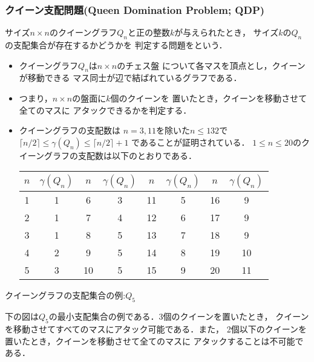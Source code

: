 \documentclass[dvipdfmx,10pt]{beamer}
\begin{document}
\begin{frame}\frametitle{クイーン支配問題(Queen Domination Problem; QDP)}
 \begin{block}{}
  サイズ$n\times n$のクイーングラフ$Q_n$と正の整数$k$が与えられたとき，
  サイズ$k$の$Q_n$の支配集合が存在するかどうかを
  判定する問題をという．
  \begin{itemize}
   \item クイーングラフ$Q_n$は$n\times n$のチェス盤
	 について各マスを頂点とし，クイーンが移動できる
	 マス同士が辺で結ばれているグラフである．
   \item つまり，$n \times n$の盤面に$k$個のクイーンを
	 置いたとき，クイーンを移動させて全てのマスに
	 アタックできるかを判定する．
  \end{itemize}
 \end{block}
 \begin{block}{}
  \begin{itemize}
   \item クイーングラフの支配数は
$n=3,11$を除いた$n \leq 132$で $\lceil n/2 \rceil 
\leq \gamma(Q_{n}) \leq \lceil n/2 \rceil +1$
であることが証明されている．%
$1\leq n \leq 20$のクイーングラフの支配数は以下のとおりである．
  \begin{table}[hbtp]
   \centering
   \begin{tabular}{|c|c||c|c||c|c||c|c|} \hline
    $n$ & $\gamma(Q_{n})$ & $n$ & $\gamma(Q_{n})$ &$n$ & $\gamma(Q_{n})$ &$n$ & $\gamma(Q_{n})$ \\ \hline
    1 &1 &6 &3 &11 &5 &16 &9 \\ \hline
    2 &1 &7 &4 &12 &6 &17 &9 \\ \hline
    3 &1 &8 &5 &13 &7 &18 &9 \\ \hline
    4 &2 &9 &5 &14 &8 &19 &10 \\ \hline
    5 &3 &10 &5 &15 &9 &20 &11 \\ \hline
   \end{tabular}
  \end{table}
  \end{itemize}
 \end{block}
\end{frame}
 

%
%

\begin{frame}{クイーングラフの支配集合の例:$Q_5$}
  \begin{exampleblock}{}
   下の図は$Q_5$の最小支配集合の例である．3個のクイーンを置いたとき，
   クイーンを移動させてすべてのマスにアタック可能である．また，
   2個以下のクイーンを置いたとき，クイーンを移動させて全てのマスに
   アタックすることは不可能である．
  \begin{center}
   \scalebox{1.3}{
   
   }
  \end{center}
 \end{exampleblock}
\end{frame}
\end{document}

